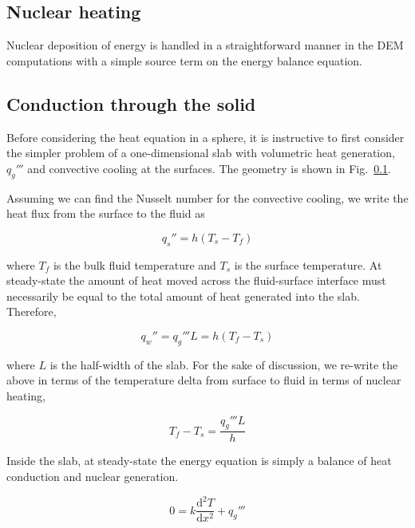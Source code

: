 \subsection{Nuclear heating}

Nuclear deposition of energy is handled in a straightforward manner in the DEM computations with a simple source term on the energy balance equation. 












\subsection{Conduction through the solid}\label{sec:ht-pebble-conduction}

Before considering the heat equation in a sphere, it is instructive to first consider the simpler problem of a one-dimensional slab with volumetric heat generation, $q_g'''$ and convective cooling at the surfaces. The geometry is shown in Fig.~\ref{}.

Assuming we can find the Nusselt number for the convective cooling, we write the heat flux from the surface to the fluid as

\begin{equation}
	q_s'' = h(T_s - T_f)	
\end{equation}

where $T_f$ is the bulk fluid temperature and $T_s$ is the surface temperature. At steady-state the amount of heat moved across the fluid-surface interface must necessarily be equal to the total amount of heat generated into the slab. Therefore,

\begin{equation}
	q_w'' = q_g'''L = h(T_f-T_s)
\end{equation}

where $L$ is the half-width of the slab. For the sake of discussion, we re-write the above in terms of the temperature delta from surface to fluid in terms of nuclear heating,

\begin{equation}\label{eq:fluid-delta}
	T_f-T_s = \frac{q_g'''L}{h}
\end{equation}

Inside the slab, at steady-state the energy equation is simply a balance of heat conduction and nuclear generation. 

\begin{equation}\label{eq:nuclear-heating-slab-ode}
	0 = k\frac{\mathrm{d}^2T}{\mathrm{d}x^2} + q_g'''
\end{equation}

